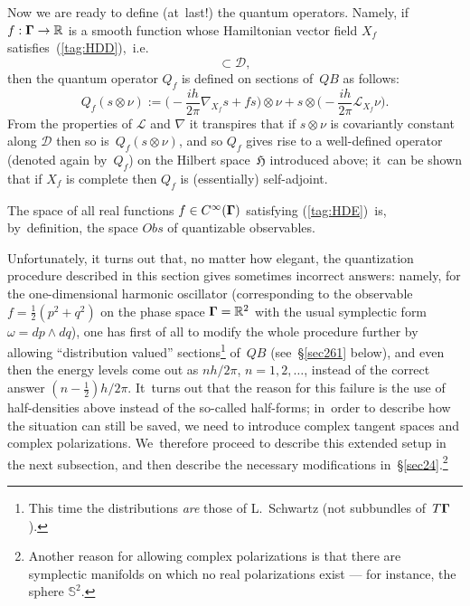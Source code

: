 \documentclass[12pt]{amsart}
\numberwithin{equation}{section}
\theoremstyle{remark}
\let\Bbb\mathbb \let\Cal\mathcal \let\frak\mathfrak
\newcommand\Obs{Obs}
\newcommand\Omg{{\bigam}}   %
\newcommand\DD{{\Cal D}}
\newcommand\LL{\Cal L}
\newcommand\HH{\mathfrak H}
\newcommand\RR{\mathbb R}
\newcommand{\bigam}{\mbox{\boldmath $\Gamma$}}
\begin{document}
Now we are ready to define (at~last!) the quantum operators. Namely, if
$f:\Omg\to\RR$ is a smooth function whose Hamiltonian vector field $X_f$
satisfies~(\ref{tag:HDD}),~i.e.
\begin{equation}  [X_f,\DD]\subset\DD,   \label{tag:HDE}  \end{equation}
then the quantum operator $Q_f$ is defined on sections of~$QB$ as follows:
\begin{equation}  Q_f(s\otimes\nu) := \Big( -\frac{ih}{2\pi} \nabla_{X_f} s +
fs\Big) \otimes\nu + s\otimes\Big(-\frac{ih}{2\pi} \LL_{X_f} \nu \Big).
\label{tag:HDF}  \end{equation}
From the properties of $\LL$ and $\nabla$ it transpires that if $s\otimes\nu$
is covariantly constant along $\DD$ then so is~$Q_f(s\otimes\nu)$, and so $Q_f$
gives rise to a well-defined operator (denoted again by~$Q_f$) on the Hilbert
space~$\HH$ introduced above; it~can be shown that if $X_f$ is complete then
$Q_f$ is (essentially) self-adjoint.

The space of all real functions $f\in C^\infty(\Omg)$ satisfying
(\ref{tag:HDE})~is, by~definition, the space $\Obs$ of quantizable observables.


Unfortunately, it turns out that, no matter how elegant, the quantization
procedure described in this section gives sometimes incorrect answers: namely,
for the one-dimensional harmonic oscillator (corresponding to the observable
$f=\frac12(p^2+q^2)$ on the phase space $\Omg=\RR^2$ with the usual symplectic
form $\omega=dp\wedge dq$), one has first of all to modify the whole procedure
further by allowing ``distribution valued'' sections\footnote{This time the
distributions {\it are} those of L.~Schwartz (not subbundles of~$T\Omg$).}
of~$QB$ (see~\S\ref{sec261} below), and even then the energy levels come out as
$nh/2\pi$, $n=1,2,\dots$, instead of the correct answer $(n-\frac12)h/2\pi$.
It~turns out that the reason for this failure is the use of half-densities
above instead of the so-called half-forms; in~order to describe how the
situation can still be saved, we need to introduce complex tangent spaces and
complex polarizations. We~therefore proceed to describe this extended setup
in the next subsection, and then describe the necessary modifications
in~\S\ref{sec24}.\footnote{Another reason for allowing complex polarizations is
that there are symplectic manifolds on which no real polarizations exist ---
for instance, the sphere $\Bbb S^2$.}
\end{document}
